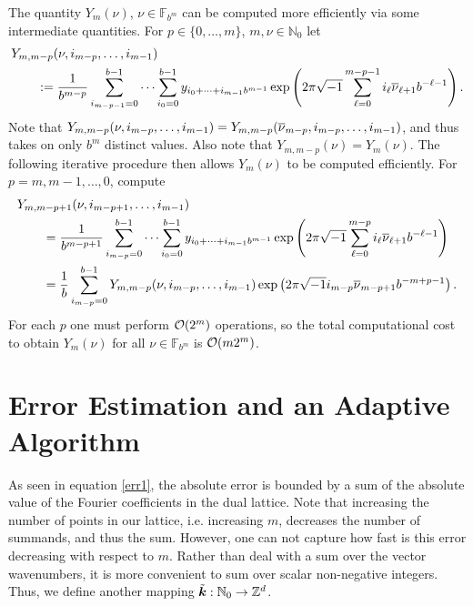 \documentclass[graybox]{svmult}
\newcommand{\Z}{\mathbb{Z}} %
\newcommand{\N}{\mathbb{N}} %
\newcommand{\F}{\mathbb{F}} %
\begin{document}
The quantity $Y_m(\nu)$, $\nu \in \F_{b^m}$ can be computed more efficiently via some intermediate quantities. For $p \in \{0, \ldots, m\}$, $m,\nu \in \N_0$ let
\begin{align*}
\MoveEqLeft{Y_{m,m-p}(\nu,i_{m-p}, \ldots, i_{m-1})} \\
& :=\frac{1}{b^{m-p}} \sum_{i_{m-p-1}=0}^{b-1} \cdots  \sum_{i_{0}=0}^{b-1} y_{i_0 + \cdots + i_{m-1} b^{m-1}} \exp\left( 2 \pi \sqrt{-1}\sum_{\ell=0}^{m-p-1} i_\ell \onu_{\ell+1}  b^{-\ell-1}  \right).
\end{align*}
Note that $Y_{m,m-p}(\nu,i_{m-p}, \ldots, i_{m-1})=Y_{m,m-p}(\overline{\nu}_{m-p},i_{m-p}, \ldots, i_{m-1})$, and thus takes on only $b^m$ distinct values.  Also note that $Y_{m,m-p}(\nu)= Y_m(\nu)$. The following iterative procedure then allows $Y_m(\nu)$ to be computed efficiently.  For $p=m, m-1, \ldots, 0$, compute
\begin{align*}
\MoveEqLeft{Y_{m,m-p+1}(\nu,i_{m-p+1}, \ldots, i_{m-1})} \\
& =\frac{1}{b^{m-p+1}} \sum_{i_{m-p}=0}^{b-1} \cdots  \sum_{i_{0}=0}^{b-1} y_{i_0 + \cdots + i_{m-1} b^{m-1}} \exp\left( 2 \pi \sqrt{-1} \sum_{\ell=0}^{m-p} i_\ell \onu_{\ell+1}  b^{-\ell-1}   \right)\\
& =\frac{1}{b} \sum_{i_{m-p}=0}^{b-1} Y_{m,m-p}(\nu,i_{m-p}, \ldots, i_{m-1})\exp\left( 2 \pi \sqrt{-1}  i_{m-p} \onu_{m-p+1} b^{-m+p-1}  \right).
\end{align*}
For each $p$ one must perform $\mathcal{O}(2^m)$ operations, so the total computational cost to obtain  $Y_m(\nu)$ for all $\nu \in \F_{b^m}$ is $\mathcal{O}(m2^m)$.


\section{Error Estimation and an Adaptive Algorithm}\label{secalgo}

As seen in equation \eqref{err1}, the absolute error is bounded by a sum of the absolute value of the Fourier coefficients in the dual lattice. Note that increasing the number of points in our lattice, i.e. increasing $m$, decreases the number of summands, and thus the sum. However, one can not capture how fast is this error decreasing with respect to $m$.  Rather than deal with a sum over the vector wavenumbers, it is more convenient to sum over scalar non-negative integers.  Thus, we define another mapping $\tvk: \N_0 \to \Z^d$.
\end{document}
